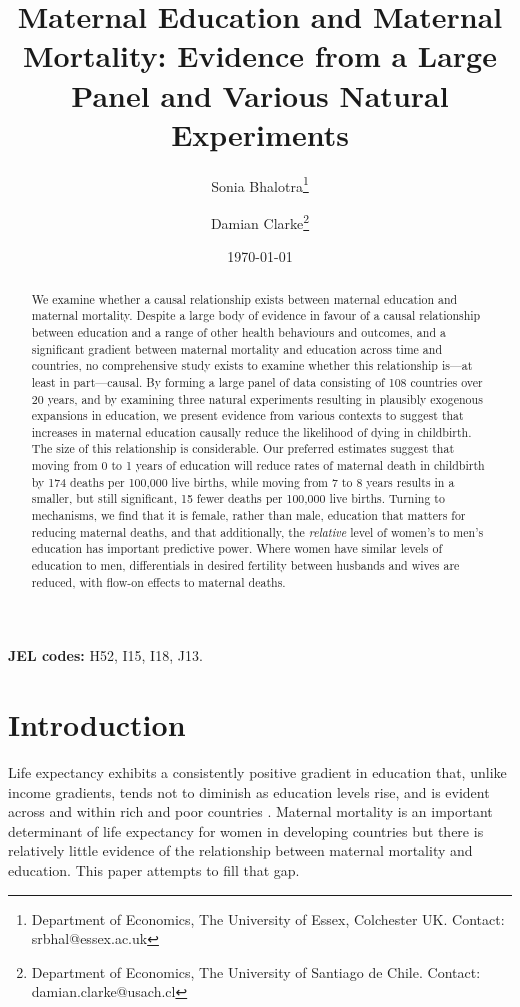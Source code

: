 \documentclass{article}[12pt,subeqn]
\title{Maternal Education and Maternal Mortality: 
Evidence from a Large Panel and Various Natural Experiments}
\author{Sonia Bhalotra\thanks{Department of Economics, The University of Essex,
    Colchester UK. Contact: srbhal@essex.ac.uk}
  \and{Damian Clarke\thanks{Department of Economics, The University of Santiago
      de Chile. Contact: damian.clarke@usach.cl}}}
\date{\today}
\begin{document}
\begin{spacing}{1.4}

\maketitle

\begin{abstract}
We examine whether a causal relationship exists between maternal education and 
maternal mortality. Despite a large body of evidence in favour of a causal 
relationship between education and a range of other health behaviours and 
outcomes, and a significant gradient between maternal mortality and education 
across time and countries, no comprehensive study exists to examine whether this 
relationship is---at least in part---causal.  By forming a large panel of data 
consisting of 108 countries over 20 years, and by examining three natural 
experiments resulting in plausibly exogenous expansions in education, we present 
evidence from various contexts to suggest that increases in maternal education
causally reduce the likelihood of dying in childbirth.  The size of this
relationship is considerable.  Our preferred estimates suggest that moving from 0
to 1 years of education will reduce rates of maternal death in childbirth by 174
deaths per 100,000 live births, while moving from 7 to 8 years results in a
smaller, but still significant, 15 fewer deaths per 100,000 live births.  Turning
to mechanisms, we find that it is female, rather than male, education that
matters for reducing maternal deaths, and that additionally, the \emph{relative}
level of women's to men's education has important predictive power.  Where women
have similar levels of education to men, differentials in desired fertility
between husbands and wives are reduced, with flow-on effects to maternal deaths.
\end{abstract}
\hspace{8mm} \textbf{JEL codes:} H52, I15, I18, J13.

\newpage
\section{Introduction}
Life expectancy exhibits a consistently positive gradient in education that, 
unlike income gradients, tends not to diminish as education levels rise, and is 
evident across and within rich and poor countries \citep{RichardsBarry1998, 
KunstMackenbach1994, EloPreston1996, LlerasMuney2005, Mearaetal2008}. Maternal 
mortality is an important determinant of life expectancy for women in developing 
countries but there is relatively little evidence of the relationship between
maternal mortality and education. This paper attempts to fill that gap.


\end{spacing}
\end{document}
